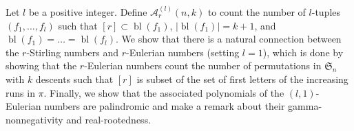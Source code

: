 \documentclass{article}
\newcommand{\SSS}{\mathfrak{S}}
\newcommand{\eul}{\mathcal{A}}
\DeclareMathOperator{\cl}{cl}
\DeclareMathOperator{\bl}{bl}
\theoremstyle{definition}
\numberwithin{equation}{section}
\begin{document}
Let $l$ be a positive integer. Define $\eul_r^{(l)}(n,k)$ to count the number of $l$-tuples $(f_1,\dots, f_l)$ such that $[r]\subset \bl(f_1)$, $|\bl(f_1)|=k+1$, and $\bl(f_1)=\dots=\bl(f_l)$. We show that there is a natural connection 
between the $r$-Stirling numbers and $r$-Eulerian numbers (setting $l=1$), which is done by showing that the $r$-Eulerian
numbers count the number of permutations in $\SSS_n$ with $k$ descents such that $[r]$ is subset of the set of first letters 
of the increasing runs in $\pi$. Finally, we show that the associated polynomials of the $(l,1)$-Eulerian numbers are palindromic and make a remark about their gamma-nonnegativity and real-rootedness.

\end{document}
